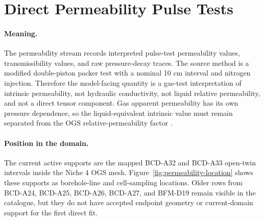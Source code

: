 
\section{Direct Permeability Pulse Tests}
\label{sec:measurement-permeability}

\paragraph{Meaning.}
The permeability stream records interpreted pulse-test permeability values,
transmissibility values, and raw pressure-decay traces.  The source method is a
modified double-piston packer test with a nominal 10 cm interval and nitrogen
injection.  Therefore the model-facing quantity is a gas-test interpretation of
intrinsic permeability, not hydraulic conductivity, not liquid relative permeability,
and not a direct tensor component.  Gas apparent permeability has its own pressure
dependence, so the liquid-equivalent intrinsic value must remain separated from the
OGS relative-permeability factor
\citep[abstract]{Klinkenberg1941}
\citep[abstract and Secs.~2.2, 3.2]{Marschall2005}.

\paragraph{Position in the domain.}
The current active supports are the mapped BCD-A32 and BCD-A33 open-twin intervals
inside the Niche 4 OGS mesh.  Figure~\ref{fig:permeability-location} shows these
supports as borehole-line and cell-sampling locations.  Older rows from BCD-A24,
BCD-A25, BCD-A26, BCD-A27, and BFM-D19 remain visible in the catalogue, but they do
not have accepted endpoint geometry or current-domain support for the first direct
fit.

